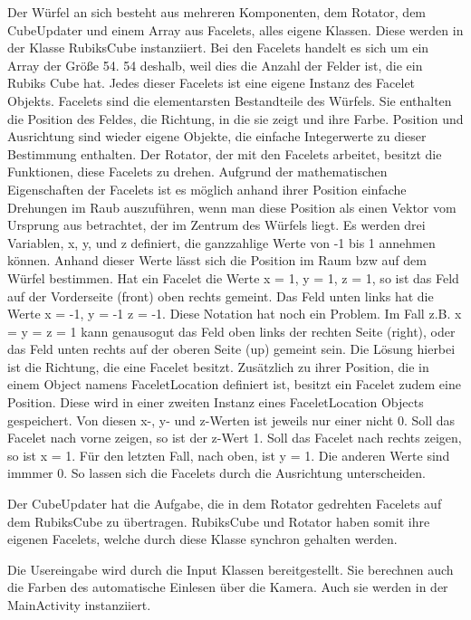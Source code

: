 Der Würfel an sich besteht aus mehreren Komponenten, dem Rotator, dem CubeUpdater
und einem Array aus Facelets, alles eigene Klassen. Diese werden in der Klasse
RubiksCube instanziiert. Bei den Facelets handelt es sich um ein
Array der Größe 54. 54 deshalb, weil dies die Anzahl der Felder ist, die ein
Rubiks Cube hat. Jedes dieser Facelets ist eine eigene Instanz des Facelet Objekts.
Facelets sind die elementarsten Bestandteile des Würfels. Sie enthalten die
Position des Feldes, die Richtung, in die sie zeigt und ihre Farbe. Position und
Ausrichtung sind wieder eigene Objekte, die einfache Integerwerte zu dieser
Bestimmung enthalten.
Der Rotator, der mit den Facelets arbeitet, besitzt die Funktionen, diese Facelets
zu drehen. Aufgrund der mathematischen Eigenschaften der Facelets ist es möglich
anhand ihrer Position einfache Drehungen im Raub auszuführen, wenn man diese
Position als einen Vektor vom Ursprung aus betrachtet, der im Zentrum des Würfels
liegt. Es werden drei Variablen, x, y, und z definiert, die ganzzahlige Werte
von -1 bis 1 annehmen können. Anhand dieser Werte lässt sich die Position im Raum
bzw auf dem Würfel bestimmen. Hat ein Facelet die Werte x = 1, y = 1, z = 1, so ist
das Feld auf der Vorderseite (front) oben rechts gemeint. Das Feld unten links hat die
Werte x = -1, y = -1 z = -1. Diese Notation hat noch ein
Problem. Im Fall z.B. x = y = z = 1 kann genausogut das Feld oben links der rechten Seite (right), oder das Feld
unten rechts auf der oberen Seite (up) gemeint sein. Die Lösung hierbei ist die Richtung,
die eine Facelet besitzt. Zusätzlich zu ihrer Position, die in einem Object namens
FaceletLocation definiert ist, besitzt ein Facelet zudem eine Position. Diese wird
in einer zweiten Instanz eines FaceletLocation Objects gespeichert. Von diesen x-, y- und z-Werten
ist jeweils nur einer nicht 0. Soll das Facelet nach vorne zeigen, so ist der z-Wert 1.
Soll das Facelet nach rechts zeigen, so ist x = 1. Für den letzten Fall, nach oben, ist y = 1.
Die anderen Werte sind immmer 0. So lassen sich die Facelets durch die Ausrichtung unterscheiden.

Der CubeUpdater hat die Aufgabe, die in dem Rotator gedrehten Facelets auf dem
RubiksCube zu übertragen. RubiksCube und Rotator haben somit ihre eigenen Facelets,
welche durch diese Klasse synchron gehalten werden.

Die Usereingabe wird durch die Input Klassen bereitgestellt. Sie berechnen auch
die Farben des automatische Einlesen über die Kamera. Auch sie werden in der
MainActivity instanziiert.

